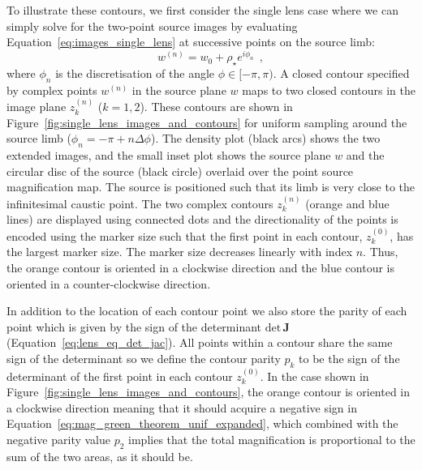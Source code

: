 \documentclass[12pt,dvipsnames]{report}
\renewcommand{\vec}[1]{\boldsymbol{\mathbf{#1}}}
\newcommand{\hquad}{~~}
\begin{document}
To illustrate these contours, we first consider the single lens case where we can
simply solve for the two-point source images by evaluating 
Equation~\ref{eq:images_single_lens} at successive points on the source limb: 
\begin{equation}
    w^{(n)}=w_0 + \rho_\star e^{i\phi_n}
    \hquad,
\end{equation}
where $\phi_n$ is the discretisation of the angle $\phi\in[-\pi,\pi)$. 
A closed contour specified by complex points $w^{(n)}$ in the
source plane $w$ maps to two closed contours in the image plane $z^{(n)}_k$ ($k=1,2$).
These contours are shown in Figure~\ref{fig:single_lens_images_and_contours} for 
uniform sampling around the source limb ($\phi_n=-\pi+n\Delta\phi$).
The density plot (black arcs) shows the two extended images, and the small inset plot shows 
the source plane $w$ and the circular disc of the source (black circle) overlaid over the 
point source magnification map. The source is positioned such that its limb is very close 
to the infinitesimal caustic point. The two complex contours $z^{(n)}_k$ (orange and 
blue lines) are displayed using connected dots and the directionality of the points
is encoded using the marker size such that the first point in each contour, $z^{(0)}_k$,
has the largest marker size. The marker size decreases linearly with index $n$. 
Thus, the orange contour is oriented in a clockwise direction and the blue contour 
is oriented in a counter-clockwise direction. 

In addition to the location of each contour 
point we also store the parity of each point which is given by the sign of the determinant 
$\mathrm{det}\,\vec J$ (Equation~\ref{eq:lens_eq_det_jac}). All points within a contour 
share the same sign of the determinant so we define the contour parity $p_k$ to be 
the sign of the determinant of the first point in each contour $z^{(0)}_k$. In the case shown in
Figure~\ref{fig:single_lens_images_and_contours}, the orange contour is oriented in a clockwise
direction meaning that it should acquire a negative sign in 
Equation~\ref{eq:mag_green_theorem_unif_expanded}, which combined with the negative parity
value $p_2$ implies that the total magnification is proportional to the sum of the two 
areas, as it should be.
\end{document}
